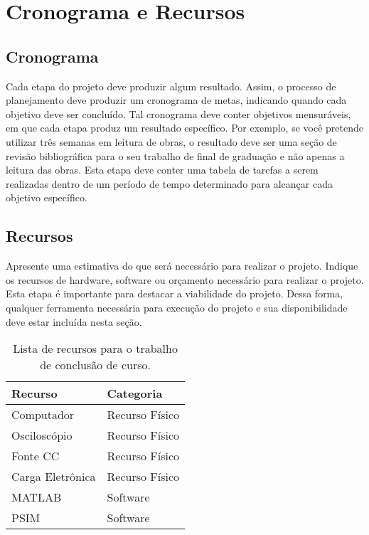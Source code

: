 \chapter{Cronograma e Recursos}
\section{Cronograma}

Cada etapa do projeto deve produzir algum resultado. Assim, o processo de planejamento deve
produzir um cronograma de metas, indicando quando cada objetivo deve ser concluído. Tal
cronograma deve conter objetivos mensuráveis, em que cada etapa produz um resultado específico.
Por exemplo, se você pretende utilizar três semanas em leitura de obras, o resultado deve ser
uma seção de revisão bibliográfica para o seu trabalho de final de graduação e não apenas a
leitura das obras. Esta etapa deve conter uma tabela de tarefas a serem realizadas dentro de um
período de tempo determinado para alcançar cada objetivo específico.

\section{Recursos}

Apresente uma estimativa do que será necessário para realizar o projeto. Indique os recursos de
hardware, software ou orçamento necessário para realizar o projeto. Esta etapa é importante
para destacar a viabilidade do projeto. Dessa forma, qualquer ferramenta necessária para
execução do projeto e sua disponibilidade deve estar incluída nesta seção.

\begin{table}[h]
    \centering
    \caption{Lista de recursos para o trabalho de conclusão de curso.}
    \label{tab:recursos}
    \begin{tabular}{|l|l|}
        \hline
        Recurso          & Categoria      \\ \hline
        Computador       & Recurso Físico \\ \hline
        Osciloscópio     & Recurso Físico \\ \hline
        Fonte CC         & Recurso Físico \\ \hline
        Carga Eletrônica & Recurso Físico \\ \hline
        MATLAB           & Software       \\ \hline
        PSIM             & Software       \\ \hline
    \end{tabular}
\end{table}